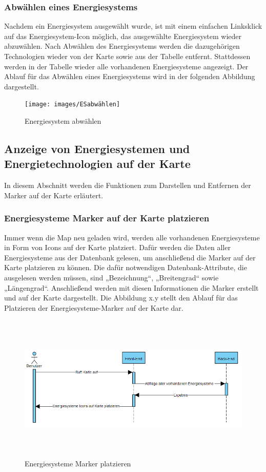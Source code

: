\newpage
\subsubsection{Abwählen eines Energiesystems}
Nachdem ein Energiesystem ausgewählt wurde, ist mit einem einfachen Linksklick auf das Energiesystem-Icon möglich, das ausgewählte Energiesystem wieder abzuwählen. Nach Abwählen des Energiesystems werden die dazugehörigen Technologien wieder von der Karte sowie aus der Tabelle entfernt. Stattdessen werden in der Tabelle wieder alle vorhandenen Energiesysteme angezeigt. Der Ablauf für das Abwählen eines Energiesystems wird in der folgenden Abbildung dargestellt.
\newline
\begin{figure}[h]
	\centering
	\texttt{[image: images/ESabwählen]}
	\caption{Energiesystem abwählen}
	\label{fig:Energiesystem abwählen }
\end{figure}


\newpage
\subsection{Anzeige von Energiesystemen und Energietechnologien auf der Karte}
In diesem Abschnitt werden die Funktionen zum Darstellen und Entfernen der Marker auf der Karte erläutert.



\subsubsection{Energiesysteme Marker auf der Karte platzieren}
Immer wenn die Map neu geladen wird, werden alle vorhandenen Energiesysteme in Form von Icons auf der Karte platziert. Dafür werden die Daten aller Energiesysteme aus der Datenbank gelesen, um anschließend die Marker auf der Karte platzieren zu können. Die dafür notwendigen Datenbank-Attribute, die ausgelesen werden müssen, sind „Bezeichnung“, „Breitengrad“ sowie „Längengrad“. Anschließend werden mit diesen Informationen die Marker erstellt und auf der Karte dargestellt. Die Abbildung x.y stellt den Ablauf für das Platzieren der Energiesysteme-Marker auf der Karte dar.
\newline
\begin{figure}[h]
	\centering
	\includegraphics[height=7cm,width=14cm]{images/SetESMarker}
	\caption{Energiesysteme Marker platzieren}
	\label{fig:Energiesystem auswählen }
\end{figure}

